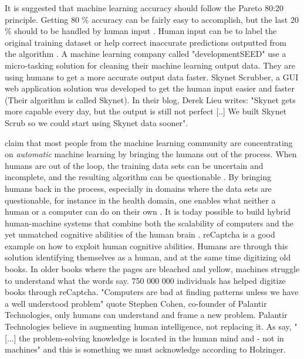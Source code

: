 It is suggested that machine learning accuracy should follow the Pareto 80:20 principle. Getting 80 \% accuracy can be fairly easy to accomplish, but the last 20 \% should to be handled by human input \citep{Biewald2015} \citep{Oppenheimer2017}. Human input can be to label the original training dataset or help correct inaccurate predictions outputted from the algorithm \citep{Oppenheimer2017}. A machine learning company called "developmentSEED" use a micro-tasking solution for cleaning their machine learning output data. They are using humans to get a more accurate output data faster. Skynet Scrubber, a GUI web application solution was developed to get the human input easier and faster (Their algorithm is called Skynet). In their blog, Derek Lieu writes: "Skynet gets more capable every day, but the output is still not perfect [..] We built Skynet Scrub so we could start using Skynet data sooner". 

\citep{Holzinger2016} claim that most people from the machine learning community are concentrating on \textit{automatic} machine learning by bringing the humans out of the process. When humans are out of the loop, the training data sets can be uncertain and incomplete, and the resulting algorithm can be questionable \citep{Holzinger2016}. By bringing humans back in the process, especially in domains where the data sets are questionable, for instance in the health domain, one enables what neither a human or a computer can do on their own \citep{Holzinger2016}. It is today possible to build hybrid human-machine systems that combine both the scalability of computers and the yet unmatched cognitive abilities of the human brain \citep{Difallah2016}. reCaptcha is a good example on how to exploit human cognitive abilities. Humans are through this solution identifying themselves as a human, and at the same time digitizing old books. In older books where the pages are bleached and yellow, machines struggle to understand what the words say. 750 000 000 individuals has helped digitize books through reCaptcha. %
"Computers are bad at finding patterns unless we have a well understood problem" quote Stephen Cohen, co-founder of Palantir Technologies, only humans can understand and frame a new problem. %
Palantir Technologies believe in augmenting human intelligence, not replacing it. As \cite{Holzinger2013} say, "[...] the problem-solving knowledge is located in the human mind and - not in machines" and this is something we must acknowledge according to Holzinger. 

